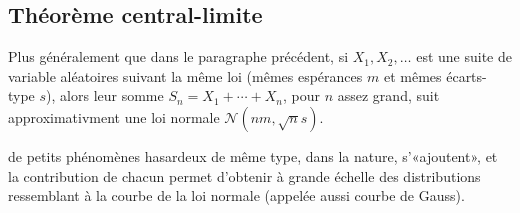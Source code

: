 \documentclass[a4paper,11pt]{article} \usepackage{FBarticle} \mapage{831}{Probabilités 2} %
\begin{document}
\begin{multicols}{2}
\section{Théorème central-limite}
Plus généralement que dans le paragraphe précédent, si $X_1,X_2,\ldots$ est une suite de variable aléatoires suivant la même loi (mêmes espérances $m$ et mêmes écarts-type $s$), alors leur somme $S_n=X_1+\cdots+X_n$, pour $n$ assez grand, suit approximativment une loi normale $\mathcal{N}\left(nm,\sqrt{n}s\right)$.\par
\rema de petits phénomènes hasardeux de même type, dans la nature, s'«ajoutent», et la contribution de chacun permet d'obtenir à grande échelle des distributions ressemblant à la courbe de la loi normale (appelée aussi courbe de Gauss).





\end{multicols}
\end{document}
